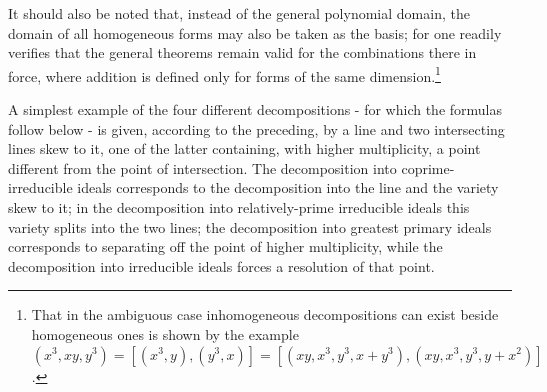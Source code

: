 \documentclass[11pt]{article}
\begin{document}
It should also be noted that, instead of the general polynomial domain, the domain of all homogeneous forms may also be taken as the basis; for one readily verifies that the general theorems remain valid for the combinations there in force, where addition is defined only for forms of the same dimension.\footnote{That in the ambiguous case inhomogeneous decompositions can exist beside homogeneous ones is shown by the example $(x^3,xy,y^3)=[(x^3,y),(y^3,x)]=[(xy,x^3,y^3,x+y^3),(xy,x^3,y^3,y+x^2)]$.}

A simplest example of the four different decompositions - for which the formulas follow below - is given, according to the preceding, by a line and two intersecting lines skew to it, one of the latter containing, with higher multiplicity, a point different from the point of intersection. The decomposition into coprime-irreducible ideals corresponds to the decomposition into the line and the variety skew to it; in the decomposition into relatively-prime irreducible ideals this variety splits into the two lines; the decomposition into greatest primary ideals corresponds to separating off the point of higher multiplicity, while the decomposition into irreducible ideals forces a resolution of that point.
\end{document}
